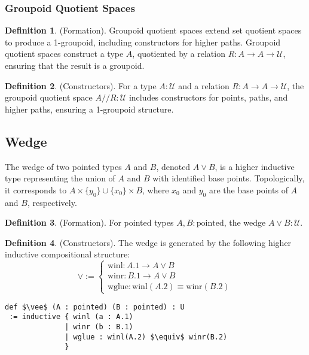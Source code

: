 \documentclass{article}
\theoremstyle{definition}
\newtheorem{definition}{Definition}
\begin{document}
\subsubsection*{Groupoid Quotient Spaces}
\begin{definition} (Formation).
Groupoid quotient spaces extend set quotient spaces to produce a 1-groupoid,
including constructors for higher paths. Groupoid quotient spaces
construct a type \( A \), quotiented by a relation \( R : A \to A \to \mathcal{U} \),
ensuring that the result is a groupoid.
\end{definition}

\begin{definition} (Constructors).
For a type \( A : \mathcal{U} \) and a relation \( R : A \to A \to \mathcal{U} \),
the groupoid quotient space \( A // R : \mathcal{U} \) includes
constructors for points, paths, and higher paths, ensuring a 1-groupoid structure.
\end{definition}

\newpage
\subsection{Wedge}
The wedge of two pointed types \( A \) and \( B \), denoted \( A \vee B \),
is a higher inductive type representing the union of \( A \)
and \( B \) with identified base points. Topologically,
it corresponds to \( A \times \{ y_0 \} \cup \{ x_0 \} \times B \),
where \( x_0 \) and \( y_0 \) are the base points of \( A \) and \( B \), respectively.

\begin{definition} (Formation).
For pointed types \( A, B : \text{pointed} \), the wedge \( A \vee B : \mathcal{U} \).
\end{definition}

\begin{definition} (Constructors).
The wedge is generated by the following higher inductive compositional structure:
\[
\vee :=
\begin{cases}
\text{winl} : A.1 \to A \vee B \\
\text{winr} : B.1 \to A \vee B \\
\text{wglue} : \text{winl} (A.2) \equiv \text{winr}(B.2)
\end{cases}
\]
\begin{lstlisting}[mathescape=true]
def $\vee$ (A : pointed) (B : pointed) : U
 := inductive { winl (a : A.1)
              | winr (b : B.1)
              | wglue : winl(A.2) $\equiv$ winr(B.2)
              }
\end{lstlisting}
\end{definition}
\end{document}
